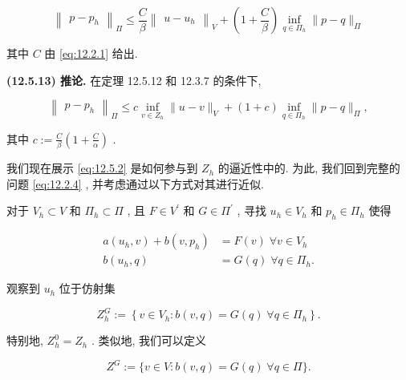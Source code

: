 $$
{\begin{Vmatrix}p - {p}_{h}\end{Vmatrix}}_{\varPi } \leq  \frac{C}{\beta }{\begin{Vmatrix}u - {u}_{h}\end{Vmatrix}}_{V} + \left( {1 + \frac{C}{\beta }}\right) \mathop{\inf }\limits_{{q \in  {\varPi }_{h}}}\| p - q\|_{\varPi }
$$

其中 $C$ 由 \eqref{eq:12.2.1} 给出.

\textbf{(12.5.13) 推论.} 在定理 12.5.12 和 12.3.7 的条件下,

$$
{\begin{Vmatrix}p - {p}_{h}\end{Vmatrix}}_{\varPi } \leq  c\mathop{\inf }\limits_{{v \in  {Z}_{h}}}\| u - v\|_{V} + \left( {1 + c}\right) \mathop{\inf }\limits_{{q \in  {\varPi }_{h}}}\| p - q\|_{\varPi },
$$

其中 $c:=\frac{C}{\beta }\left( {1 + \frac{C}{\alpha }}\right)$ .

我们现在展示 \eqref{eq:12.5.2} 是如何参与到 ${Z}_{h}$ 的逼近性中的. 为此, 我们回到完整的问题 \eqref{eq:12.2.4} , 并考虑通过以下方式对其进行近似.

对于 ${V}_{h} \subset  V$ 和 ${\varPi }_{h} \subset  \varPi$ , 且 $F \in  {V}^{\prime }$ 和 $G \in  {\varPi }^{\prime }$ , 寻找 ${u}_{h} \in  {V}_{h}$ 和 ${p}_{h} \in  {\varPi }_{h}$ 使得

\begin{equation}\label{eq:12.5.14}
\begin{aligned}
a\left( {{u}_{h},v}\right)  + b\left( {v,{p}_{h}}\right)  &= F\left( v\right) \;\forall v \in  {V}_{h} \\
b\left( {{u}_{h},q}\right)  &= G\left( q\right) \;\forall q \in  {\varPi }_{h}.
\end{aligned}
\end{equation}

观察到 ${u}_{h}$ 位于仿射集

\begin{equation}\label{eq:12.5.15}
{Z}_{h}^{G}:=\left\{  {v \in  {V}_{h} : b\left( {v,q}\right)  = G\left( q\right) \;\forall q \in  {\varPi }_{h}}\right\}  .
\end{equation}

特别地, ${Z}_{h}^{0} = {Z}_{h}$ . 类似地, 我们可以定义

\begin{equation}\label{eq:12.5.16}
{Z}^{G}:=\{ v \in  V : b\left( {v,q}\right)  = G\left( q\right) \;\forall q \in  \varPi \} .
\end{equation}

